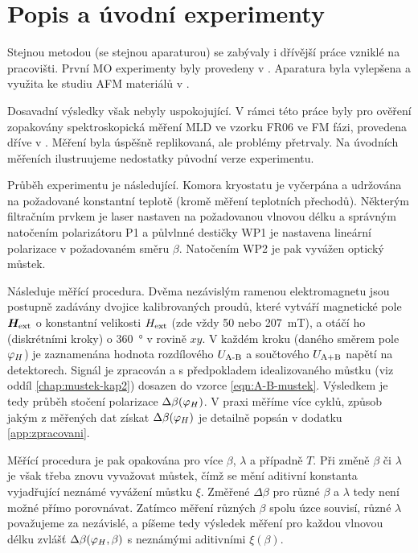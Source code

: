 \section{Popis a úvodní experimenty}
\label{chap:vychozi-situace}

Stejnou metodou (se stejnou aparaturou) se zabývaly i dřívější práce vzniklé na pracovišti.
První MO experimenty byly provedeny v \cite{wohlrathMagnetooptickaCharakterizaceSpintronickych2018}. 
Aparatura byla vylepšena a využita ke studiu AFM materiálů v \cite{kubascikMagnetooptickeStudiumAntiferomagnetickych2019,kimakOptickaSpektroskopieAntiferomagnetu2019}.

Dosavadní výsledky však nebyly uspokojující.
V rámci této práce byly pro ověření zopakovány spektroskopická měření MLD ve vzorku FR06 ve FM fázi, provedena dříve v \cite{kubascikMagnetooptickeStudiumAntiferomagnetickych2019}.
Měření byla úspěšně replikovaná, ale problémy přetrvaly.
Na úvodních měřeních ilustruujeme nedostatky původní verze experimentu.

Průběh experimentu je následující.
Komora kryostatu je vyčerpána a udržována na požadované konstantní teplotě (kromě měření teplotních přechodů).
Některým filtračním prvkem je laser nastaven na požadovanou vlnovou délku a správným natočením polarizátoru P1 a půlvlnné destičky WP1 je nastavena lineární polarizace v požadovaném směru $\beta$.
Natočením WP2 je pak vyvážen optický můstek.

Následuje měřící procedura. 
Dvěma nezávislým ramenou elektromagnetu jsou postupně zadávány dvojice kalibrovaných proudů, které vytváří magnetické pole $\bm{H}_\textrm{ext}$ o konstantní velikosti $H_\textrm{ext}$ (zde vždy \num{50} nebo \SI{207}{\milli\tesla}), a otáčí ho (diskrétními kroky) o \SI{360}{\degree} v rovině $xy$.
V každém kroku (daného směrem pole $\varphi_H$) je zaznamenána hodnota rozdílového $U_\textrm{A-B}$ a součtového $U_\textrm{A+B}$ napětí na detektorech.
Signál je zpracován a s předpokladem idealizovaného můstku (viz oddíl \ref{chap:mustek-kap2}) dosazen do vzorce \eqref{eqn:A-B-mustek}.
Výsledkem je tedy průběh stočení polarizace $\Delta\beta(\varphi_H)$.
V praxi měříme více cyklů, způsob jakým z měřených dat získat $\Delta\beta(\varphi_H)$ je detailně popsán v dodatku \ref{app:zpracovani}.

Měřící procedura je pak opakována pro více $\beta$, $\lambda$ a případně $T$.
Při změně $\beta$ či $\lambda$ je však třeba znovu vyvažovat můstek, čímž se mění aditivní konstanta vyjadřující neznámé vyvážení můstku $\xi$.
Změřené $\Delta\beta$ pro různé $\beta$ a $\lambda$ tedy není možné přímo porovnávat.
Zatímco měření různých $\beta$ spolu úzce souvisí, různé $\lambda$ považujeme za nezávislé, a píšeme tedy výsledek měření pro každou vlnovou délku zvlášť $\Delta\beta(\varphi_H, \beta)$ s neznámými aditivními $\xi(\beta)$.


